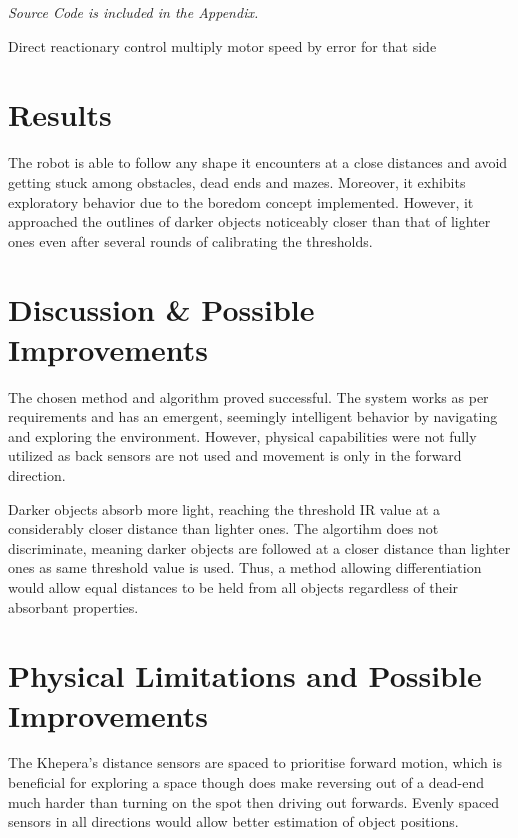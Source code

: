 \documentclass[11pt, a4paper]{article}
\begin{document}
\begin{center}
  \emph{Source Code is included in the Appendix.}
\end{center}



Direct reactionary control multiply motor speed by error for that side


\newpage
\section{Results}

The robot is able to follow any shape it encounters at a close distances and 
avoid getting stuck among obstacles, dead ends and mazes. Moreover, it exhibits 
exploratory behavior due to the boredom concept implemented. However, it approached
the outlines of darker objects noticeably closer than that of lighter ones 
even after several rounds of calibrating the thresholds.


\section{Discussion \& Possible Improvements}

The chosen method and algorithm proved successful. The system works as
per requirements and has an emergent, seemingly intelligent behavior by navigating and 
exploring the environment. However, physical capabilities were not fully utilized
as back sensors are not used and movement is only in the forward direction. 


Darker objects absorb more light, reaching the threshold IR value at a considerably closer 
distance than lighter ones. The algortihm does not discriminate, meaning darker objects are 
followed at a closer distance than lighter ones as same threshold value is used. Thus, a 
method allowing differentiation would allow equal distances to be held from all objects 
regardless of their absorbant properties. 


\section{Physical Limitations and Possible Improvements}

The Khepera's distance sensors are spaced to prioritise forward motion, which is beneficial 
for exploring a space though does make reversing out of a dead-end much harder than 
turning on the spot then driving out forwards. Evenly spaced sensors in all directions would 
allow better estimation of object positions.
\end{document}
